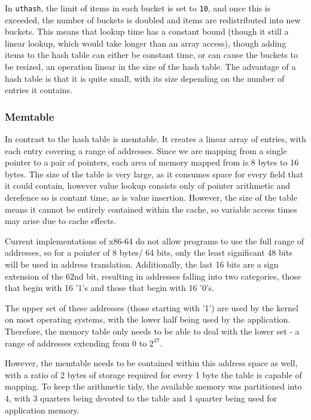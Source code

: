 In \verb!uthash!, the limit of items in each bucket is set to \verb!10!, and once this is exceeded, the number of buckets is doubled and items are redistributed into new buckets.
This means that lookup time has a constant bound (though it still a linear lookup, which would take longer than an array access), though adding items to the hash table can either be constant time, or can cause the buckets to be resized, an operation linear in the size of the hash table.
The advantage of a hash table is that it is quite small, with its size depending on the number of entries it contains.

\subsubsection{Memtable}

In contrast to the hash table is memtable.
It creates a linear array of entries, with each entry covering a range of addresses.
Since we are mapping from a single pointer to a pair of pointers, each area of memory mapped from is 8 bytes to 16 bytes.
The size of the table is very large, as it consumes space for every field that it could contain, however value lookup consists only of pointer arithmetic and derefence so is contant time, as is value insertion.
However, the size of the table means it cannot be entirely contained within the cache, so variable access times may arise due to cache effects.

Current implementations of x86-64 do not allow programs to use the full range of addresses, so for a pointer of 8 bytes/ 64 bits, only the least significant 48 bits will be used in address translation.
Additionally, the last 16 bits are a sign extension of the 62nd bit, resulting in addresses falling into two categories, those that begin with 16 '1's and those that begin with 16 '0's.

The upper set of these addresses (those starting with '1') are used by the kernel on most operating systems, with the lower half being used by the application.
Therefore, the memory table only needs to be able to deal with the lower set - a range of addresses extending from $0$ to $2^{47}$.

However, the memtable needs to be contained within this address space as well, with a ratio of 2 bytes of storage required for every 1 byte the table is capable of mapping.
To keep the arithmetic tidy, the available memory was partitioned into 4, with 3 quarters being devoted to the table and 1 quarter being used for application memory.

